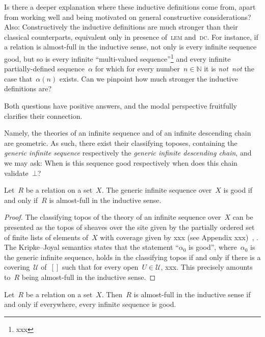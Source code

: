 \documentclass[envcountsect,envcountsame,runningheads]{llncs}
\newcommand{\U}{\mathcal{U}}
\newcommand{\NN}{\mathbb{N}}
\renewcommand{\_}{\mathpunct{.}\,}
\newcommand{\notnot}{\emph{not~not}\xspace}
\newcommand{\?}{\,{:}\,}
\begin{document}
Is there a deeper explanation where these inductive definitions come from,
apart from working well and being motivated on general constructive
considerations? Also: Constructively the inductive definitions are much
stronger than their classical counterparts, equivalent only in presence
of~\textsc{lem} and~\textsc{dc}. For instance, if a relation is almost-full in
the inductive sense, not only is every infinite sequence good, but so is every
infinite ``multi-valued sequence''\footnote{xxx} and every infinite
partially-defined sequence~$\alpha$ for which for every number~$n \in \NN$ it
is \notnot the case that~$\alpha(n)$ exists. Can we pinpoint how much stronger
the inductive definitions are?

Both questions have positive answers, and the modal
perspective fruitfully clarifies their connection.

Namely, the theories of an infinite sequence and of an infinite descending chain
are geometric. As such, there exist their classifying toposes, containing the
\emph{generic infinite sequence} respectively the \emph{generic infinite
descending chain}, and we may ask: When is this sequence good respectively when
does this chain validate~$\bot$?

\begin{proposition}\label{prop:gen-good}Let~$R$ be a relation on a set~$X$. The
generic infinite sequence over~$X$ is good if and only if~$R$ is almost-full in
the inductive sense.\end{proposition}

\begin{proof}The classifying topos of the theory of an infinite sequence
over~$X$ can be presented as the topos of sheaves over the site given by the
partially ordered set of finite lists of elements of~$X$ with coverage given
by xxx (see Appendix xxx)~\cite[Example~4.3]{blechschmidt-schuster:reifying}, \cite[xxx]{joyal-tierny:xxx}. The Kripke--Joyal semantics states that the
statement ``$\alpha_0$ is good'', where~$\alpha_0$ is the generic infinite
sequence, holds in the classifying topos if and only if there is a
covering~$\U$ of~$[]$ such that for every open~$U \in \U$, xxx. This precisely
amounts to~$R$ being almost-full in the inductive sense.
\end{proof}

\begin{corollary}\label{cor:modal-good}Let~$R$ be a relation on a set~$X$. Then~$R$
is almost-full in the inductive sense if and only if everywhere, every infinite
sequence is good.\end{corollary}
\end{document}
